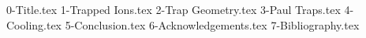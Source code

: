 \documentclass[%
 reprint,
 amsmath,amssymb,
 aps,
]{revtex4-2}
\begin{document}

{0-Title.tex}
{1-Trapped Ions.tex}
{2-Trap Geometry.tex}
{3-Paul Traps.tex}
{4-Cooling.tex}
{5-Conclusion.tex}
{6-Acknowledgements.tex}
{7-Bibliography.tex}
\end{document}
